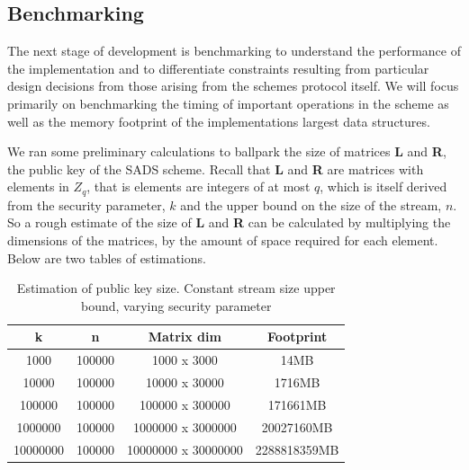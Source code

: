 \documentclass[11pt, letterpaper, oneside]{article}
\begin{document}
	\subsection{ Benchmarking }
	
	The next stage of development is benchmarking to understand the performance of the implementation and to differentiate constraints resulting from particular design decisions from those arising from the schemes protocol itself.
	We will focus primarily on benchmarking the timing of important operations in the scheme as well as the memory footprint of the implementations largest data structures.
	
	We ran some preliminary calculations to ballpark the size of matrices \textbf{L} and \textbf{R}, the public key of the SADS scheme.
	Recall that \textbf{L} and \textbf{R} are matrices with elements in $Z_q$, that is elements are integers of at most $q$, which is itself derived from the security parameter, $k$ and the upper bound on the size of the stream, $n$.
	So a rough estimate of the size of \textbf{L} and \textbf{R} can be calculated by multiplying the dimensions of the matrices, by the amount of space required for each element.
	Below are two tables of estimations.
	
	\begin{table}[h]
	\centering
	
		\begin{tabular} { c | c | c | c}
		
		k & n & Matrix dim & Footprint\\ \hline
		1000&100000&1000 x 3000&14MB\\
		10000&100000&10000 x 30000&1716MB\\
		100000&100000&100000 x 300000&171661MB\\
		1000000&100000&1000000 x 3000000&20027160MB\\
		10000000&100000&10000000 x 30000000&2288818359MB\\	
		\end{tabular}
	
	\caption{Estimation of public key size.  Constant stream size upper bound, varying security parameter } 
	\label{tab:pub-key-k}
	\end{table}
	
\end{document}

